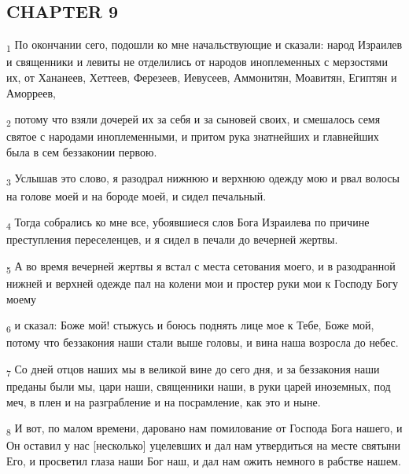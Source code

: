 \subsection{CHAPTER 9}
\begin{tcolorbox}
\textsubscript{1} По окончании сего, подошли ко мне начальствующие и сказали: народ Израилев и священники и левиты не отделились от народов иноплеменных с мерзостями их, от Хананеев, Хеттеев, Ферезеев, Иевусеев, Аммонитян, Моавитян, Египтян и Аморреев,
\end{tcolorbox}
\begin{tcolorbox}
\textsubscript{2} потому что взяли дочерей их за себя и за сыновей своих, и смешалось семя святое с народами иноплеменными, и притом рука знатнейших и главнейших была в сем беззаконии первою.
\end{tcolorbox}
\begin{tcolorbox}
\textsubscript{3} Услышав это слово, я разодрал нижнюю и верхнюю одежду мою и рвал волосы на голове моей и на бороде моей, и сидел печальный.
\end{tcolorbox}
\begin{tcolorbox}
\textsubscript{4} Тогда собрались ко мне все, убоявшиеся слов Бога Израилева по причине преступления переселенцев, и я сидел в печали до вечерней жертвы.
\end{tcolorbox}
\begin{tcolorbox}
\textsubscript{5} А во время вечерней жертвы я встал с места сетования моего, и в разодранной нижней и верхней одежде пал на колени мои и простер руки мои к Господу Богу моему
\end{tcolorbox}
\begin{tcolorbox}
\textsubscript{6} и сказал: Боже мой! стыжусь и боюсь поднять лице мое к Тебе, Боже мой, потому что беззакония наши стали выше головы, и вина наша возросла до небес.
\end{tcolorbox}
\begin{tcolorbox}
\textsubscript{7} Со дней отцов наших мы в великой вине до сего дня, и за беззакония наши преданы были мы, цари наши, священники наши, в руки царей иноземных, под меч, в плен и на разграбление и на посрамление, как это и ныне.
\end{tcolorbox}
\begin{tcolorbox}
\textsubscript{8} И вот, по малом времени, даровано нам помилование от Господа Бога нашего, и Он оставил у нас [несколько] уцелевших и дал нам утвердиться на месте святыни Его, и просветил глаза наши Бог наш, и дал нам ожить немного в рабстве нашем.
\end{tcolorbox}
